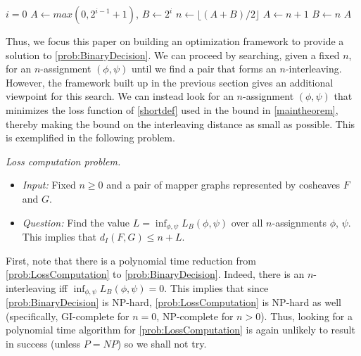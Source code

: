 \begin{algorithm}
\caption{Binary Search For $N$}
\label{alg:BinarySearch}
\begin{algorithmic}[1]
    \State $i=0$
    \EndWhile
    \State $ A \gets max(0, 2^{i-1} + 1)$, $B \gets 2^i$
        \State $n \gets \lfloor (A + B) / 2 \rfloor$
            \State $A \gets n+1$ 
        \Else
            \State  $B \gets n$ 
        \EndIf
    \EndWhile
    \State \Return $A$ 
\EndProcedure
\end{algorithmic}
\end{algorithm}



Thus, we focus this paper on building an optimization framework to provide a solution to \cref{prob:BinaryDecision}. 
We can proceed by searching, given a fixed $n$, for an $n$-assignment $(\phi,\psi)$ until we find a pair that forms an $n$-interleaving. 
However, the framework built up in the previous section gives an additional viewpoint for this search. 
We can instead look for an $n$-assignment $(\phi,\psi)$ that minimizes the loss function of \cref{shortdef} used in the bound in \cref{maintheorem}, thereby making the bound on the interleaving distance as small as possible. 
This is exemplified in the following problem. 

\begin{problem} 
\label{prob:LossComputation} 
\emph{Loss computation problem.}
\begin{itemize}
    \item \emph{Input:} Fixed $n\geq 0$ and a pair of mapper graphs represented by cosheaves  $F$ and $G$. 
    \item \emph{Question:} Find the value $L = \inf_{\phi,\psi}L_B(\phi,\psi)$ over all $n$-assignments $\phi$, $\psi$. This implies that $d_I(F,G) \leq n+L$.  
\end{itemize}
\end{problem}

First, note that there is a polynomial time reduction from  \cref{prob:LossComputation}  to \cref{prob:BinaryDecision}. 
Indeed, there is an $n$-interleaving iff $\inf_{\phi,\psi}L_B(\phi,\psi) = 0$. 
This implies that since \cref{prob:BinaryDecision} is NP-hard, \cref{prob:LossComputation} is NP-hard as well (specifically, GI-complete for $n=0$, NP-complete for $n >0$). 
Thus, looking for a polynomial time algorithm for \cref{prob:LossComputation} is again unlikely to result in success (unless $P=NP$) so we shall not try. 

